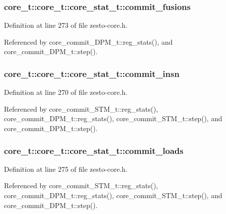 \subsubsection[{commit\_\-fusions}]{ core\_\-t::core\_\-t::core\_\-stat\_\-t::commit\_\-fusions}\label{structcore__t_1_1core__stat__t_6c057bd1e63107df76c484a31595b75e}




Definition at line 273 of file zesto-core.h.

Referenced by core\_\-commit\_\-DPM\_\-t::reg\_\-stats(), and core\_\-commit\_\-DPM\_\-t::step().
\subsubsection[{commit\_\-insn}]{ core\_\-t::core\_\-t::core\_\-stat\_\-t::commit\_\-insn}\label{structcore__t_1_1core__stat__t_695be096dc6d4c3ef8dadfb9875a3c38}




Definition at line 270 of file zesto-core.h.

Referenced by core\_\-commit\_\-STM\_\-t::reg\_\-stats(), core\_\-commit\_\-DPM\_\-t::reg\_\-stats(), core\_\-commit\_\-STM\_\-t::step(), and core\_\-commit\_\-DPM\_\-t::step().
\subsubsection[{commit\_\-loads}]{ core\_\-t::core\_\-t::core\_\-stat\_\-t::commit\_\-loads}\label{structcore__t_1_1core__stat__t_6795007baed703f79069c605b342462c}




Definition at line 275 of file zesto-core.h.

Referenced by core\_\-commit\_\-STM\_\-t::reg\_\-stats(), core\_\-commit\_\-DPM\_\-t::reg\_\-stats(), core\_\-commit\_\-STM\_\-t::step(), and core\_\-commit\_\-DPM\_\-t::step().
